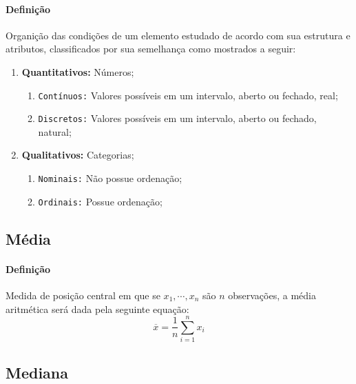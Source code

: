 \documentclass{article}
\begin{document}
            \paragraph{Definição}Organição das condições de um elemento estudado de acordo com sua estrutura e atributos, classificados por sua semelhança como mostrados a seguir:
                \begin{enumerate}[noitemsep]
                    \item \textbf{Quantitativos:} Números;
                        \begin{enumerate}[noitemsep]
                            \item \texttt{Contínuos:} Valores possíveis em um intervalo, aberto ou fechado, real;
                            \item \texttt{Discretos:} Valores possíveis em um intervalo, aberto ou fechado, natural;
                        \end{enumerate}
                    \item \textbf{Qualitativos:} Categorias;
                        \begin{enumerate}[noitemsep]
                            \item \texttt{Nominais:} Não possue ordenação;
                            \item \texttt{Ordinais:} Possue ordenação;
                        \end{enumerate}
                \end{enumerate}

        \subsection{Média}
            \paragraph{Definição}Medida de posição central em que se $x_{1}, \cdots, x_{n}$ são $n$ observações, a média aritmética será dada pela seguinte equação:
                \begin{equation}
                    \boxed{
                        \overline{x} = \frac{1}{n} \sum_{i = 1}^{n} x_{i}
                    }
                \end{equation}

        \subsection{Mediana}
\end{document}
